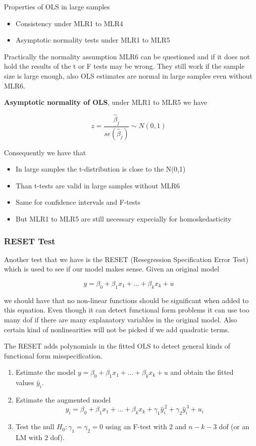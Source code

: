 Properties of OLS in large samples 

\begin{itemize}
    \item Consistency under MLR1 to MLR4
    \item Asymptotic normality tests under MLR1 to MLR5
\end{itemize}

Practically the normality assumption MLR6 can be questioned and if it does not hold the results of the t or F tests may be wrong. They still work if the sample size is large enough, also OLS estimates are normal in large samples even without MLR6.

\vspace{10pt}

\textbf{Asymptotic normality of OLS}, under MLR1 to MLR5 we have

\[
z = \frac{\hat{\beta}_j}{se(\hat{\beta}_j)} \sim N(0,1)
\]

Consequently we have that 

\begin{itemize}
    \item In large samples the t-distribution is close to the N(0,1)
    \item Than t-tests are valid in large samples without MLR6
    \item Same for confidence intervals and F-tests
    \item But MLR1 to MLR5 are still necessary expecially for homoskedasticity
\end{itemize}

\subsubsection{RESET Test}

Another test that we have is the RESET (Resegression Specification Error Test) which is used to see if our model makes sense. Given an original model

\[
y = \beta_0 +\beta_1x_1 + ... + \beta_kx_k + u
\]

we should have that no non-linear functions should be significant when added to this equation. Even though it can detect functional form problems it can use too many dof if there are many explanatory variables in the original model. Also certain kind of nonlinearities will not be picked if we add quadratic terms.

The RESET adds polynomials in the fitted OLS to detect general kinds of functional form misspecification.
\begin{enumerate}
    \item Estimate the model $y = \beta_0 + \beta_1 x_1 + \dots + \beta_k x_k + u$ and obtain the fitted values $\hat{y}_i$.
    \item Estimate the augmented model 
    \[
        y_i = \beta_0 + \beta_1 x_1 + \dots + \beta_k x_k 
        + \gamma_1 \hat{y}_i^{\,2} + \gamma_2 \hat{y}_i^{\,3} + u_i
    \]
    \item Test the null $H_0 : \gamma_1 = \gamma_2 = 0$ using an F-test with $2$ and $n-k-3$ dof (or an LM with $2$ dof).
\end{enumerate}


